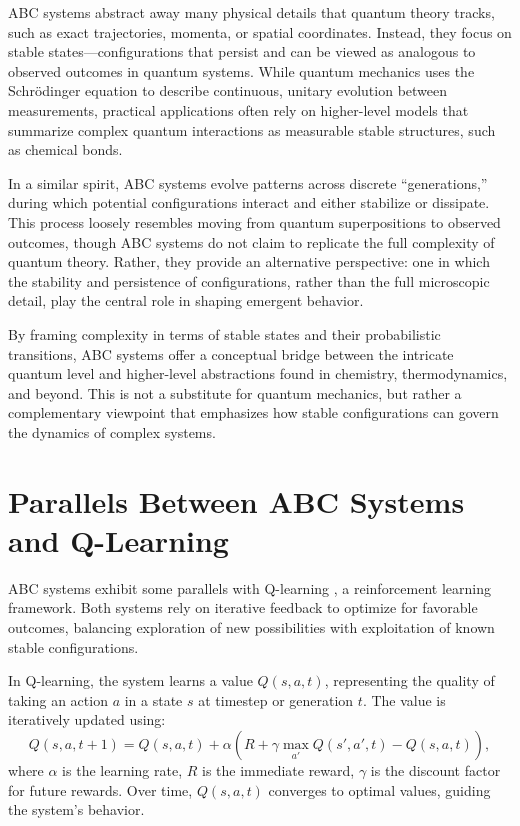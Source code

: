 \documentclass[entropy,article,submit,pdftex,moreauthors]{Definitions/mdpi}
\begin{document}
ABC systems abstract away many physical details that quantum theory tracks, such as exact trajectories, momenta, or spatial coordinates. Instead, they focus on stable states—configurations that persist and can be viewed as analogous to observed outcomes in quantum systems. While quantum mechanics uses the Schrödinger equation to describe continuous, unitary evolution between measurements, practical applications often rely on higher-level models that summarize complex quantum interactions as measurable stable structures, such as chemical bonds.

In a similar spirit, ABC systems evolve patterns across discrete “generations,” during which potential configurations interact and either stabilize or dissipate. This process loosely resembles moving from quantum superpositions to observed outcomes, though ABC systems do not claim to replicate the full complexity of quantum theory. Rather, they provide an alternative perspective: one in which the stability and persistence of configurations, rather than the full microscopic detail, play the central role in shaping emergent behavior.

By framing complexity in terms of stable states and their probabilistic transitions, ABC systems offer a conceptual bridge between the intricate quantum level and higher-level abstractions found in chemistry, thermodynamics, and beyond. This is not a substitute for quantum mechanics, but rather a complementary viewpoint that emphasizes how stable configurations can govern the dynamics of complex systems.


\section{Parallels Between ABC Systems and Q-Learning}

ABC systems exhibit some parallels with Q-learning \cite{sutton2018reinforce}, a reinforcement learning framework. Both systems rely on iterative feedback to optimize for favorable outcomes, balancing exploration of new possibilities with exploitation of known stable configurations.

In Q-learning, the system learns a value \( Q(s, a, t) \), representing the quality of taking an action \( a \) in a state \( s \) at timestep or generation \( t \). The value is iteratively updated using:
\[
Q(s, a, t+1) = Q(s, a, t) + \alpha \left( R + \gamma \max_{a'} Q(s', a', t) - Q(s, a, t) \right),
\]
where \( \alpha \) is the learning rate, \( R \) is the immediate reward, \( \gamma \) is the discount factor for future rewards. Over time, \( Q(s, a, t) \) converges to optimal values, guiding the system's behavior.
\end{document}
